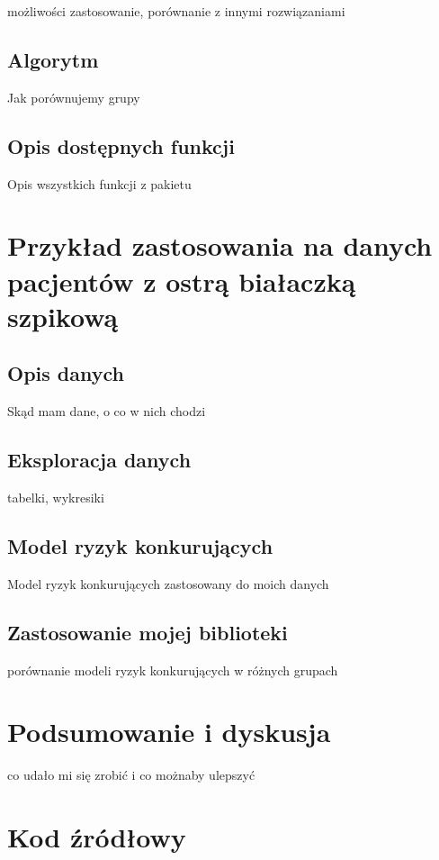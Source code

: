 \documentclass[]{pracamgr}
\begin{document}
możliwości zastosowanie, porównanie z innymi rozwiązaniami

\section{Algorytm}

Jak porównujemy grupy

\section{Opis dostępnych funkcji}

Opis wszystkich funkcji z pakietu

\chapter{Przykład zastosowania na danych pacjentów z ostrą białaczką szpikową}\label{r:fifak}

\section{Opis danych}

Skąd mam dane, o co w nich chodzi

\section{Eksploracja danych}

tabelki, wykresiki

\section{Model ryzyk konkurujących}

Model ryzyk konkurujących zastosowany do moich danych

\section{Zastosowanie mojej biblioteki}
porównanie modeli ryzyk konkurujących w różnych grupach


\chapter{Podsumowanie i dyskusja}\label{r:impl}

co udało mi się zrobić i co możnaby ulepszyć

\chapter{Kod źródłowy}
\end{document}
